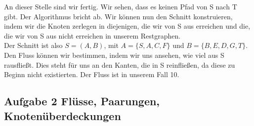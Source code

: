 \documentclass[11pt,a4paper,ngerman]{article}
\begin{document}
An dieser Stelle sind wir fertig. Wir sehen, dass es keinen Pfad von S nach T gibt. Der Algorithmus bricht ab. Wir können nun den Schnitt konstruieren, indem wir die Knoten zerlegen in diejenigen, die wir von S aus erreichen und die, die wir von S aus nicht erreichen in unserem Restgraphen.\\

Der Schnitt ist also $S=(A,B)$, mit $A=\{ S, A, C, F\}$ und $B=\{ B, E, D,  G, T \}$. Den Fluss können wir bestimmen, indem wir uns ansehen, wie viel aus S rausfließt. Dies steht für uns an den Kanten, die in S reinfließen, da diese zu Beginn nicht existierten. Der Fluss ist in unserem Fall 10.
\subsection*{Aufgabe 2 \mdseries Flüsse, Paarungen, Knotenüberdeckungen}
\end{document}

